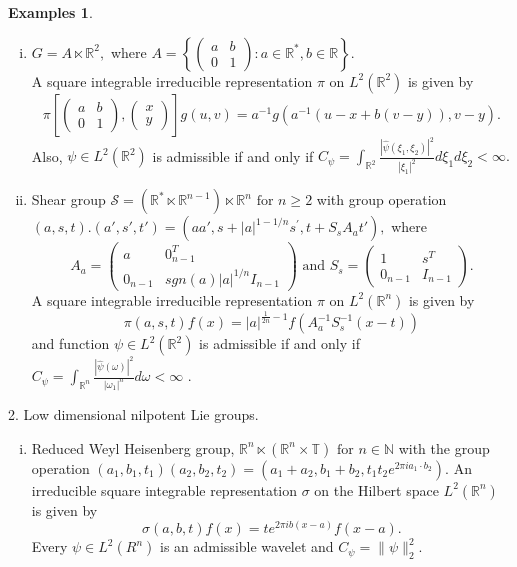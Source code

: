 \documentclass[11pt,reqno]{amsart}
\numberwithin{equation}{section}
\theoremstyle{definition}
\newtheorem{exs}[thm]{\sc Examples}
\begin{document}
\begin{exs}
\begin{enumerate}[(i)]
\item $G =A \ltimes \mathbb{R}^2 ,$ where $A = \left\{\begin{pmatrix}
a & b\\
0 & 1
\end{pmatrix}:a\in \mathbb{R}^*,b\in \mathbb{R}\right\}$.\\
 A square integrable irreducible representation $\pi$ on $L^2(\mathbb{R}^2)$ is given by  
$$\pi\left[ \begin{pmatrix}
a & b\\
0 & 1
\end{pmatrix}, \begin{pmatrix}
 x\\
 y
\end{pmatrix} \right] g(u,v) = a^{-1}g\left(
a^{-1}(u-x+b(v-y)), v-y\right).$$
Also, $\psi \in L^2(\mathbb{R}^2)$ is admissible if and only if  $ C_{\psi}=\int_{\mathbb{R}^2}\frac{|\widehat{\psi}(\xi_1,\xi_2)|^2}{|\xi_1|^2}d\xi_1d\xi_2 < \infty.$
\item  Shear group $\mathcal{S} = (\mathbb{R}^{*} \ltimes \mathbb{R}^{n-1})\ltimes \mathbb{R}^{n} \text{ for } n\geq 2 $ with group operation
$(a,s,t).(a',s',t') = (aa',s+|a|^{1-1/n}s^{'}, t+S_s A_a t'),$ where
 $$
 A_a = \begin{pmatrix}
 a & 0_{n-1}^T \\
 0_{n-1} & sgn(a)|a|^{1/n}I_{n-1} 
\end{pmatrix}  \text{ and }
S_s = \begin{pmatrix}
1 & s^{T}\\
0_{n-1} & I_{n-1}
\end{pmatrix}.$$
A square integrable irreducible representation $\pi$ on $L^2{(\mathbb{R}^n)}$ is given by 
$$\pi(a,s,t)f(x) = |a|^{\frac{1}{2n}-1}f(A_a^{-1}S_s^{-1}(x-t))$$ and function $\psi \in L^2(\mathbb{R}^2) $ is admissible if and only if $C_{\psi} = \int_{\mathbb{R}^n} \frac{|\widehat{\psi}(\omega)|^2}{|\omega_1|^n} d\omega < \infty$ \cite{dah;10}.
\end{enumerate}
2. Low dimensional nilpotent Lie groups.
\begin{enumerate}[(i)]
\item Reduced Weyl Heisenberg group, $ \mathbb{R}^{n} \ltimes (\mathbb{R}^{n} \times \mathbb{T})\text{ for } n\in \mathbb{N}$ with the group operation $(a_1, b_1,t_1)(a_2,b_2,t_2) = (a_1+a_2, b_1+b_2, t_1 t_2e^{2\pi i a_1\cdot b_2}).$
An irreducible square integrable representation $\sigma$ on the Hilbert space $ L^2(\mathbb{R}^n)$ is given by 
$$\sigma(a,b,t)f(x)= te^{2\pi i b(x-a)}f(x-a).$$
Every $\psi \in L^2(R^n)$ is an admissible wavelet and $C_{\psi} = \|\psi\|_2^2$.
\end{enumerate}


\end{exs}
\end{document}
